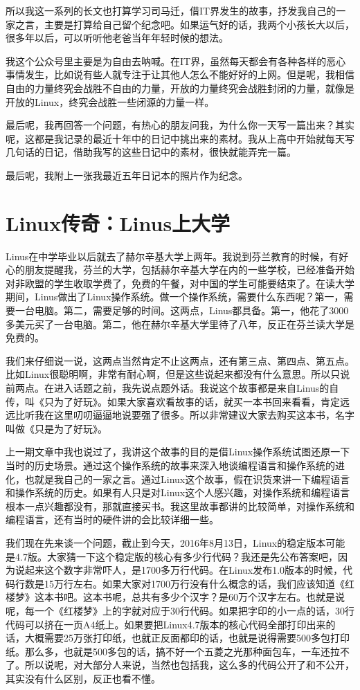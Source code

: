 \documentclass[
  letterpaper,
  DIV=11,
  numbers=noendperiod]{scrreprt}
\begin{document}
所以我这一系列的长文也打算学习司马迁，借IT界发生的故事，抒发我自己的一家之言，主要是打算给自己留个纪念吧。如果运气好的话，我两个小孩长大以后，很多年以后，可以听听他老爸当年年轻时候的想法。

我这个公众号里主要是为自由去呐喊。在IT界，虽然每天都会有各种各样的恶心事情发生，比如说有些人就专注于让其他人怎么不能好好的上网。但是呢，我相信自由的力量终究会战胜不自由的力量，开放的力量终究会战胜封闭的力量，就像是开放的Linux，终究会战胜一些闭源的力量一样。

最后呢，我再回答一个问题，有热心的朋友问我，为什么你一天写一篇出来？其实呢，这都是我记录的最近十年中的日记中挑出来的素材。我从上高中开始就每天写几句话的日记，借助我写的这些日记中的素材，很快就能弄完一篇。

最后呢，我附上一张我最近五年日记本的照片作为纪念。


\chapter{Linux传奇：Linus上大学}\label{linuxux4f20ux5947linusux4e0aux5927ux5b66}

Linus在中学毕业以后就去了赫尔辛基大学上两年。我说到芬兰教育的时候，有好心的朋友提醒我，芬兰的大学，包括赫尔辛基大学在内的一些学校，已经准备开始对非欧盟的学生收取学费了，免费的午餐，对中国的学生可能要结束了。在读大学期间，Linus做出了Linux操作系统。做一个操作系统，需要什么东西呢？第一，需要一台电脑。第二，需要足够的时间。这两点，Linus都具备。第一，他花了3000多美元买了一台电脑。第二，他在赫尔辛基大学里待了八年，反正在芬兰读大学是免费的。

我们来仔细说一说，这两点当然肯定不止这两点，还有第三点、第四点、第五点。比如Linux很聪明啊，非常有耐心啊，但是这些说起来都没有什么意思。所以只说前两点。在进入话题之前，我先说点题外话。我说这个故事都是来自Linus的自传，叫《只为了好玩》。如果大家喜欢看故事的话，就买一本书回来看看，肯定远远比听我在这里叨叨逼逼地说要强了很多。所以非常建议大家去购买这本书，名字叫做《只是为了好玩》。

上一期文章中我也说过了，我讲这个故事的目的是借Linux操作系统试图还原一下当时的历史场景。通过这个操作系统的故事来深入地谈编程语言和操作系统的进化，也就是我自己的一家之言。通过Linux这个故事，假在识货来讲一下编程语言和操作系统的历史。如果有人只是对Linux这个人感兴趣，对操作系统和编程语言根本一点兴趣都没有，那就直接买书。我这里故事都讲的比较简单，对操作系统和编程语言，还有当时的硬件讲的会比较详细一些。

我们现在先来谈一个问题，截止到今天，2016年8月13日，Linux的稳定版本可能是4.7版。大家猜一下这个稳定版的核心有多少行代码？我还是先公布答案吧，因为说起来这个数字非常吓人，是1700多万行代码。在Linux发布1.0版本的时候，代码行数是15万行左右。如果大家对1700万行没有什么概念的话，我们应该知道《红楼梦》这本书吧。这本书呢，总共有多少个汉字？是60万个汉字左右。也就是说呢，每一个《红楼梦》上的字就对应于30行代码。如果把字印的小一点的话，30行代码可以挤在一页A4纸上。如果要把Linux4.7版本的核心代码全部打印出来的话，大概需要25万张打印纸，也就正反面都印的话，也就是说得需要500多包打印纸。那么多，也就是500多包的话，搞不好一个五菱之光那种面包车，一车还拉不了。所以说呢，对大部分人来说，当然也包括我，这么多的代码公开了和不公开，其实没有什么区别，反正也看不懂。
\end{document}

